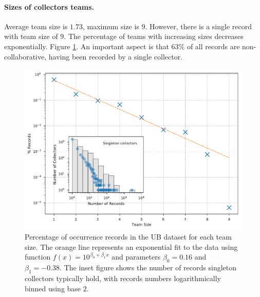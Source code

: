 \paragraph*{Sizes of collectors teams.}
Average team size is $ 1.73$, maximum size is $9$.
However, there is a single record with team size of $9$.
The percentage of teams with increasing sizes decreases exponentially.
Figure \ref{fig:ub_team_sizes}.
%
An important aspect is that $63\%$ of all records are non-collaborative, having been recorded by a single collector.

\begin{figure}[!h]
  	\centering
    \includegraphics[width=0.9\linewidth]{figures/casestudy_ub/team_sizes.pdf}
    \caption{ Percentage of occurrence records in the UB dataset for each team size. The orange line represents an exponential fit to the data using function $f(x) = 10^{\beta_0 + \beta_1 x}$ and parameters $\beta_0=0.16$ and $\beta_1=-0.38$. The inset figure shows the number of records singleton collectors typically hold, with records numbers logarithmically binned using base $2$. }
    \label{fig:ub_team_sizes}
\end{figure}

